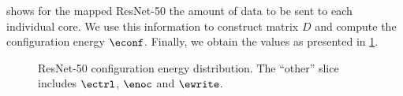 
 shows for the mapped ResNet-50 the amount of data to be sent to each individual core.
We use this information to construct matrix $D$ and compute the configuration energy $\econf$.
Finally, we obtain the values as presented in \cref{fig:resnet50_conf_energy_distribution}.



\begin{figure}[hbtp]
    \centering
    \hfill
    \caption{ResNet-50 configuration energy distribution. The ``other'' slice includes $\ectrl$, $\enoc$ and $\ewrite$.}
    \label{fig:resnet50_conf_energy_distribution}
\end{figure}


